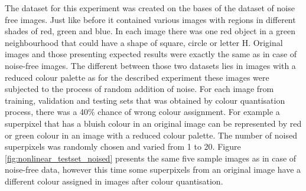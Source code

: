 The dataset for this experiment was created on the bases of the dataset of noise free images. Just like before it contained various images with regions in different shades of red, green and blue. In each image there was one red object in a green neighbourhood that could have a shape of square, circle or letter H. Original images and those presenting expected results were exactly the same as in case of noise-free images. The different between those two datasets lies in images with a reduced colour palette as for the described experiment these images were subjected to the process of random addition of noise. For each image from training, validation and testing sets that was obtained by colour quantisation process, there was a 40\% chance of wrong colour assignment. For example a superpixel that has a bluish colour in an original image can be represented by red or green colour in an image with a reduced colour palette. The number of noised superpixels was randomly chosen and varied from 1 to 20. Figure \ref{fig:nonlinear_testset_noised} presents the same five sample images as in case of noise-free data, however this time some superpixels from an original image have a different colour assigned in images after colour quantisation. 

